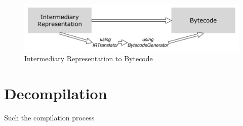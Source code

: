 \documentclass[a4paper,10pt,twoside]{book}
\begin{document}
\begin{figure}[ht]\centering
	\includegraphics[width=\linewidth]{IRToBytecode}
	\caption{Intermediary Representation to Bytecode }
\end{figure}

\section{Decompilation}
Such the compilation process

\ifx\wholebook\relax\else
   
   
\end{document}
